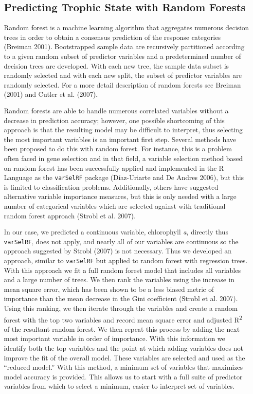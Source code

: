 \documentclass[12pt,]{article}
\begin{document}
\subsection{Predicting Trophic State with Random
Forests}\label{predicting-trophic-state-with-random-forests}

Random forest is a machine learning algorithm that aggregates numerous
decision trees in order to obtain a consensus prediction of the response
categories (Breiman 2001). Bootstrapped sample data are recursively
partitioned according to a given random subset of predictor variables
and a predetermined number of decision trees are developed. With each
new tree, the sample data subset is randomly selected and with each new
split, the subset of predictor variables are randomly selected. For a
more detail description of random forests see Breiman (2001) and Cutler
et al. (2007).

Random forests are able to handle numerous correlated variables without
a decrease in prediction accuracy; however, one possible shortcoming of
this approach is that the resulting model may be difficult to interpret,
thus selecting the most important variables is an important first step.
Several methods have been proposed to do this with random forest. For
instance, this is a problem often faced in gene selection and in that
field, a variable selection method based on random forest has been
successfully applied and implemented in the R Language as the
\texttt{varSelRF} package (D{í}az-Uriarte and De Andres 2006), but this
is limited to classification problems. Additionally, others have
suggested alternative variable importance measures, but this is only
needed with a large number of categorical variables which are selected
against with traditional random forest approach (Strobl et al. 2007).

In our case, we predicted a continuous variable, chlorophyll \emph{a},
directly thus \texttt{varSelRF}, does not apply, and nearly all of our
variables are continuous so the approach suggested by Strobl (2007) is
not necessary. Thus we developed an approach, similar to
\texttt{varSelRF} but applied to random forest with regression trees.
With this approach we fit a full random forest model that includes all
variables and a large number of trees. We then rank the variables using
the increase in mean square error, which has been shown to be a less
biased metric of importance than the mean decrease in the Gini
coefficient (Strobl et al. 2007). Using this ranking, we then iterate
through the variables and create a random forest with the top two
variables and record mean square error and adjusted R\textsuperscript{2}
of the resultant random forest. We then repeat this process by adding
the next most important variable in order of importance. With this
information we identify both the top variables and the point at which
adding variables does not improve the fit of the overall model. These
variables are selected and used as the ``reduced model.'' With this
method, a minimum set of variables that maximizes model accuracy is
provided. This allows us to start with a full suite of predictor
variables from which to select a minimum, easier to interpret set of
variables.
\end{document}
